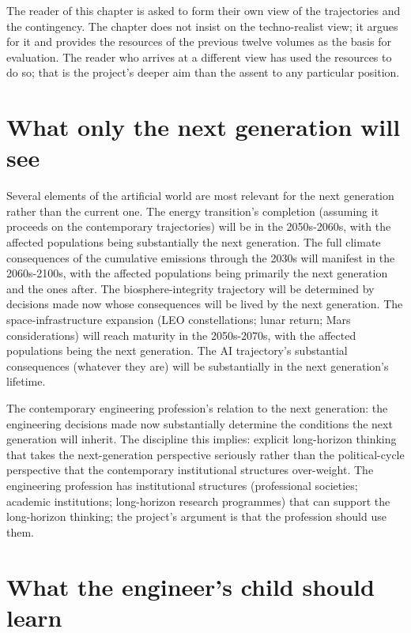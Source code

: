 The reader of this chapter is asked to form their own view of the trajectories and the contingency. The chapter does not insist on the techno-realist view; it argues for it and provides the resources of the previous twelve volumes as the basis for evaluation. The reader who arrives at a different view has used the resources to do so; that is the project's deeper aim than the assent to any particular position.

\section{What only the next generation will see}

Several elements of the artificial world are most relevant for the next generation rather than the current one. The energy transition's completion (assuming it proceeds on the contemporary trajectories) will be in the 2050s-2060s, with the affected populations being substantially the next generation. The full climate consequences of the cumulative emissions through the 2030s will manifest in the 2060s-2100s, with the affected populations being primarily the next generation and the ones after. The biosphere-integrity trajectory will be determined by decisions made now whose consequences will be lived by the next generation. The space-infrastructure expansion (LEO constellations; lunar return; Mars considerations) will reach maturity in the 2050s-2070s, with the affected populations being the next generation. The AI trajectory's substantial consequences (whatever they are) will be substantially in the next generation's lifetime.

The contemporary engineering profession's relation to the next generation: the engineering decisions made now substantially determine the conditions the next generation will inherit. The discipline this implies: explicit long-horizon thinking that takes the next-generation perspective seriously rather than the political-cycle perspective that the contemporary institutional structures over-weight. The engineering profession has institutional structures (professional societies; academic institutions; long-horizon research programmes) that can support the long-horizon thinking; the project's argument is that the profession should use them.

\section{What the engineer's child should learn}

